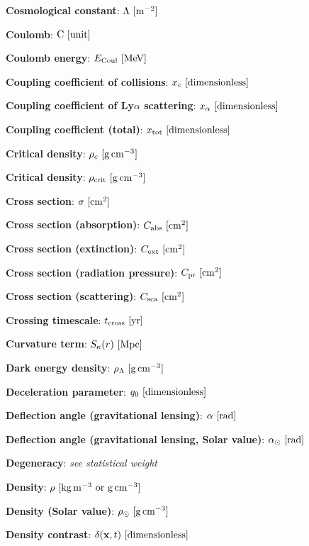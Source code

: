 \documentclass[a4paper,10pt]{article}
\begin{document}
{\noindent}\textbf{Cosmological constant}: $\Lambda ~ [{\rm m^{-2}}]$

{\noindent}\textbf{Coulomb}: ${\rm C} ~ [{\rm unit}]$

{\noindent}\textbf{Coulomb energy}: $E_{\rm Coul} ~ [{\rm MeV}]$

{\noindent}\textbf{Coupling coefficient of collisions}: $x_c ~ [{\rm dimensionless}]$

{\noindent}\textbf{Coupling coefficient of Ly$\alpha$ scattering}: $x_\alpha ~ [{\rm dimensionless}]$

{\noindent}\textbf{Coupling coefficient (total)}: $x_\mathrm{tot} ~ [{\rm dimensionless}]$

{\noindent}\textbf{Critical density}: $\rho_c ~ [{\rm g\,cm^{-3}}]$

{\noindent}\textbf{Critical density}: $\rho_\mathrm{crit} ~ [{\rm g\,cm^{-3}}]$

{\noindent}\textbf{Cross section}: $\sigma ~ [{\rm cm^{2}}]$

{\noindent}\textbf{Cross section (absorption)}: $C_{\rm abs} ~ [{\rm cm^{2}}]$

{\noindent}\textbf{Cross section (extinction)}: $C_{\rm ext} ~ [{\rm cm^{2}}]$

{\noindent}\textbf{Cross section (radiation pressure)}: $C_{\rm pr} ~ [{\rm cm^{2}}]$

{\noindent}\textbf{Cross section (scattering)}: $C_{\rm sca} ~ [{\rm cm^{2}}]$

{\noindent}\textbf{Crossing timescale}: $t_\mathrm{cross} ~ [{\rm yr}]$

{\noindent}\textbf{Curvature term}: $S_\kappa(r) ~ [{\rm Mpc}]$

{\noindent}\textbf{Dark energy density}: $\rho_\Lambda ~ [{\rm g\,cm^{-3}}]$

{\noindent}\textbf{Deceleration parameter}: $q_0 ~ [{\rm dimensionless}]$

{\noindent}\textbf{Deflection angle (gravitational lensing)}: $\alpha ~ [{\rm rad}]$

{\noindent}\textbf{Deflection angle (gravitational lensing, Solar value)}: $\alpha_\odot ~ [{\rm rad}]$

{\noindent}\textbf{Degeneracy}: \textit{see statistical weight}

{\noindent}\textbf{Density}: $\rho ~ [{\rm kg\,m^{-3}~{\rm or}~g\,cm^{-3}}]$

{\noindent}\textbf{Density (Solar value)}: $\rho_\odot ~ [{\rm g\,cm^{-3}}]$

{\noindent}\textbf{Density contrast}: $\delta(\mathbf{x},t) ~ [{\rm dimensionless}]$
\end{document}
